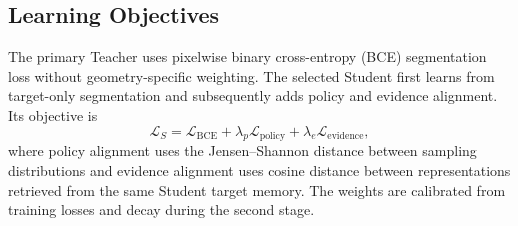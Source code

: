 \subsection{Learning Objectives}
The primary Teacher uses pixelwise binary cross-entropy (BCE) segmentation loss without geometry-specific weighting. The selected Student first learns from target-only segmentation and subsequently adds policy and evidence alignment. Its objective is
\begin{equation}
\mathcal{L}_S=\mathcal{L}_{\mathrm{BCE}}+
\lambda_p\mathcal{L}_{\mathrm{policy}}+
\lambda_e\mathcal{L}_{\mathrm{evidence}},
\label{eq:student_loss}
\end{equation}
where policy alignment uses the Jensen--Shannon distance between sampling distributions and evidence alignment uses cosine distance between representations retrieved from the same Student target memory. The weights are calibrated from training losses and decay during the second stage.

